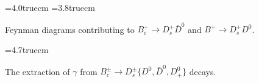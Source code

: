 \documentclass[12pt]{article}
\begin{document}
\begin{figure}
\begin{center}
\leavevmode
\epsfysize=4.0truecm 
 \hspace*{1truecm}
\epsfysize=3.8truecm 
\end{center}
\vspace*{-0.4truecm}
\caption{Feynman diagrams contributing to $B^+_c\to D_s^+\bar D^0$ and 
$B^+\to D_s^+D^0$. }\label{fig:BcDsD}
\end{figure}


\begin{figure}
\vspace*{0.3truecm}
\begin{center}
\leavevmode
\epsfysize=4.7truecm 
\end{center}
\vspace*{-0.6truecm}
\caption{The extraction of $\gamma$ from 
$B_c^\pm\to D^\pm_s\{D^0,\bar D^0,D^0_+\}$ decays.}\label{fig:triangles}
\end{figure}
\end{document}
